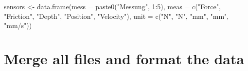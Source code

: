 \documentclass[
]{article}
\newenvironment{Shaded}{\begin{snugshade}}{\end{snugshade}}
\newcommand{\AttributeTok}[1]{\textcolor[rgb]{0.77,0.63,0.00}{#1}}
\newcommand{\DecValTok}[1]{\textcolor[rgb]{0.00,0.00,0.81}{#1}}
\newcommand{\FunctionTok}[1]{\textcolor[rgb]{0.00,0.00,0.00}{#1}}
\newcommand{\NormalTok}[1]{#1}
\newcommand{\OtherTok}[1]{\textcolor[rgb]{0.56,0.35,0.01}{#1}}
\newcommand{\SpecialCharTok}[1]{\textcolor[rgb]{0.00,0.00,0.00}{#1}}
\newcommand{\StringTok}[1]{\textcolor[rgb]{0.31,0.60,0.02}{#1}}
\begin{document}
\begin{Shaded}
\begin{Highlighting}[]
\NormalTok{sensors }\OtherTok{\textless{}{-}} \FunctionTok{data.frame}\NormalTok{(}\AttributeTok{mess =} \FunctionTok{paste0}\NormalTok{(}\StringTok{"Messung"}\NormalTok{, }\DecValTok{1}\SpecialCharTok{:}\DecValTok{5}\NormalTok{), }
                      \AttributeTok{meas =} \FunctionTok{c}\NormalTok{(}\StringTok{"Force"}\NormalTok{, }\StringTok{"Friction"}\NormalTok{, }\StringTok{"Depth"}\NormalTok{, }\StringTok{"Position"}\NormalTok{, }\StringTok{"Velocity"}\NormalTok{), }
                      \AttributeTok{unit =} \FunctionTok{c}\NormalTok{(}\StringTok{"N"}\NormalTok{, }\StringTok{"N"}\NormalTok{, }\StringTok{"mm"}\NormalTok{, }\StringTok{"mm"}\NormalTok{, }\StringTok{"mm/s"}\NormalTok{))}
\end{Highlighting}
\end{Shaded}

\hypertarget{merge-all-files-and-format-the-data}{%
\section{Merge all files and format the
data}\label{merge-all-files-and-format-the-data}}
\end{document}
